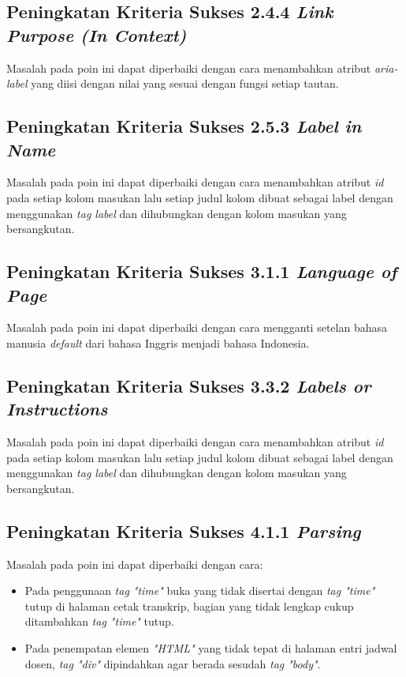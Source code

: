 \subsection{Peningkatan Kriteria Sukses 2.4.4 \textit{Link Purpose (In Context)}}
\label{subsec:peningkatan_kriteria_sukses_2.4.4}
Masalah pada poin ini dapat diperbaiki dengan cara menambahkan atribut \textit{aria-label} yang diisi dengan nilai yang sesuai dengan fungsi setiap tautan.

\subsection{Peningkatan Kriteria Sukses 2.5.3 \textit{Label in Name}}
\label{subsec:peningkatan_kriteria_sukses_2.5.3}
Masalah pada poin ini dapat diperbaiki dengan cara menambahkan atribut \textit{id} pada setiap kolom masukan lalu setiap judul kolom dibuat sebagai label dengan menggunakan \textit{tag label} dan dihubungkan dengan kolom masukan yang bersangkutan.

\subsection{Peningkatan Kriteria Sukses 3.1.1 \textit{Language of Page}}
\label{subsec:peningkatan_kriteria_sukses_3.1.1}
Masalah pada poin ini dapat diperbaiki dengan cara mengganti setelan bahasa manusia \textit{default} dari bahasa Inggris menjadi bahasa Indonesia.

\subsection{Peningkatan Kriteria Sukses 3.3.2 \textit{Labels or Instructions}}
\label{subsec:peningkatan_kriteria_sukses_3.3.2}
Masalah pada poin ini dapat diperbaiki dengan cara menambahkan atribut \textit{id} pada setiap kolom masukan lalu setiap judul kolom dibuat sebagai label dengan menggunakan \textit{tag label} dan dihubungkan dengan kolom masukan yang bersangkutan.

\subsection{Peningkatan Kriteria Sukses 4.1.1 \textit{Parsing}}
\label{subsec:peningkatan_kriteria_sukses_4.1.1}
Masalah pada poin ini dapat diperbaiki dengan cara:

\begin{itemize}
    \item Pada penggunaan \textit{tag "time"} buka yang tidak disertai dengan \textit{tag "time"} tutup di halaman cetak transkrip, bagian yang tidak lengkap cukup ditambahkan \textit{tag "time"} tutup.
    \item Pada penempatan elemen \textit{"HTML"} yang tidak tepat di halaman entri jadwal dosen, \textit{tag "div"} dipindahkan agar berada sesudah \textit{tag "body"}.
\end{itemize}